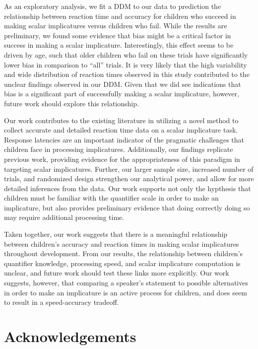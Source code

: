 \documentclass[10pt, letterpaper]{article}
\begin{document}
As an exploratory analysis, we fit a DDM to our data to prediction the
relationship between reaction time and accuracy for children who succeed
in making scalar implicatures versus children who fail. While the
results are preliminary, we found some evidence that bias might be a
critical factor in success in making a scalar implicature.
Interestingly, this effect seems to be driven by age, such that older
children who fail on these trials have significantly lower bias in
comparison to ``all'' trials. It is very likely that the high
variability and wide distribution of reaction times observed in this
study contributed to the unclear findings observed in our DDM. Given
that we did see indications that bias is a significant part of
successfully making a scalar implicature, however, future work should
explore this relationship.

Our work contributes to the existing literature in utilizing a novel
method to collect accurate and detailed reaction time data on a scalar
implicature task. Response latencies are an important indicator of the
pragmatic challenges that children face in processing implicatures.
Additionally, our findings replicate previous work, providing evidence
for the appropriateness of this paradigm in targeting scalar
implicatures. Further, our larger sample size, increased number of
trials, and randomized design strengthen our analytical power, and allow
for more detailed inferences from the data. Our work supports not only
the hypthesis that children must be familiar with the quantifier scale
in order to make an implicature, but also provides preliminary evidence
that doing correctly doing so may require additional processing time.

Taken together, our work suggests that there is a meaningful
relationship between children's accuracy and reaction times in making
scalar implicatures throughout development. From our results, the
relationship between children's quantifier knowledge, processing speed,
and scalar implicature computation is unclear, and future work should
test these links more explicitly. Our work suggests, however, that
comparing a speaker's statement to possible alternatives in order to
make an implicature is an active process for children, and does seem to
result in a speed-accuracy tradeoff.

\section{Acknowledgements}\label{acknowledgements}
\end{document}
